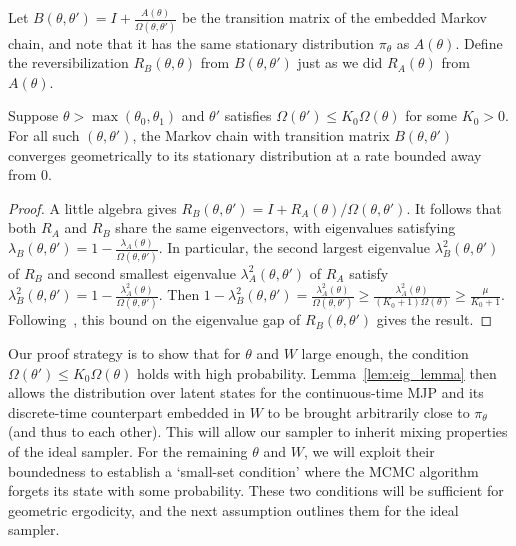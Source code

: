 Let $B(\theta, \theta') = I+\frac{A(\theta)}{\Omega(\theta, \theta')}$
be the transition matrix of the embedded Markov chain, and note that 
it has the same stationary distribution $\pi_\theta$ as $A(\theta)$.
Define the reversibilization $R_B(\theta,\theta)$ from $B(\theta,\theta')$ 
just as we did $R_A(\theta)$ from $A(\theta)$. 
\begin{lemma}
  Suppose $\theta > \max (\theta_0, \theta_1)$ and $\theta'$ satisfies 
$\Omega(\theta') \le K_0 \Omega(\theta)$ for some $K_0 > 0$. 
  For all such $(\theta,\theta')$, the Markov chain with transition 
matrix $B(\theta,\theta')$ converges geometrically to its stationary 
distribution
at a rate bounded away from $0$.
  \label{lem:eig_lemma}
\end{lemma}
\begin{proof}
A little algebra gives $R_B(\theta,\theta') = I + R_A(\theta)/\Omega(\theta,\theta')$. It 
follows that both $R_A$ and $R_B$ share the same eigenvectors, with 
eigenvalues satisfying 
$\lambda_B(\theta, \theta') = 1 - \frac{\lambda_A(\theta)}{\Omega(\theta,
\theta')}$. In particular, the second largest eigenvalue 
$\lambda^2_B(\theta,\theta')$ of $R_B$ and  
second smallest eigenvalue $\lambda^2_A(\theta,\theta')$ of $R_A$ satisfy  
$\lambda^2_B(\theta,\theta') = 1 - \frac{\lambda^2_A(\theta)}{\Omega(\theta, \theta')}$.
Then $1 - \lambda^2_B(\theta,\theta') = \frac{\lambda^2_A(\theta)}{\Omega(\theta, \theta')} 
\ge \frac{\lambda^2_A(\theta)}{(K_0+1)\Omega(\theta)} 
\ge \frac{\mu}{K_0+1} $. Following~\cite{fill1991}, this bound on the 
eigenvalue gap of $R_B(\theta,\theta')$ gives the result.
\end{proof}

Our proof strategy is to show that for $\theta$ and $W$ large enough, 
the condition $\Omega(\theta') \le K_0 \Omega(\theta)$ holds with 
high probability. Lemma~\ref{lem:eig_lemma} then allows the distribution 
over latent states for the continuous-time MJP and its discrete-time 
counterpart embedded in $W$ to be brought arbitrarily close to $\pi_\theta$ 
(and thus to each other).
This will allow our sampler 
to inherit mixing properties of the ideal sampler. For the remaining 
$\theta$ and $W$, we will exploit their boundedness to establish a 
`small-set condition' where the MCMC algorithm forgets its state with 
some probability. These two conditions will be sufficient for 
geometric ergodicity, and the next assumption outlines them for the ideal 
sampler.

